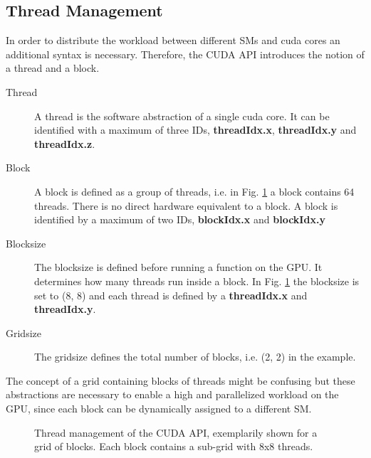 \clearpage

\subsection{Thread Management}
\label{cuda:sec_threadmanage}

In order to distribute the workload between different SMs and cuda cores an additional syntax is necessary.
Therefore, the CUDA API introduces the notion of a thread and a block.

\begin{description}
    \item[Thread] A thread is the software abstraction of a single cuda core. It can be identified with
                   a maximum of three IDs, \textbf{threadIdx.x}, \textbf{threadIdx.y} and \textbf{threadIdx.z}.

    \item[Block] A block is defined as a group of threads, i.e. in Fig. \ref{cuda:grid_example} a block contains 64 threads.
                 There  is no direct hardware equivalent to a block.
                 A block is identified by a maximum of two IDs, \textbf{blockIdx.x} and \textbf{blockIdx.y}

    \item[Blocksize] The blocksize is defined before running a function on the GPU. It determines how
                    many threads run inside a block. In Fig. \ref{cuda:grid_example} the blocksize is set to (8, 8) and
                    each thread is defined by a \textbf{threadIdx.x} and \textbf{threadIdx.y}.

    \item[Gridsize] The gridsize defines the total number of blocks, i.e. (2, 2) in the example.
\end{description}

The concept of a grid containing blocks of threads might be confusing but
these abstractions are necessary to enable a high and parallelized workload on the GPU,
since each block can be dynamically assigned to a different SM.


\begin{figure}[!bp]
      \centering
       \caption{Thread management of the CUDA API, exemplarily shown for a
       \label{cuda:grid_example}
        grid of blocks. Each block contains a sub-grid with 8x8 threads.}
\end{figure}


